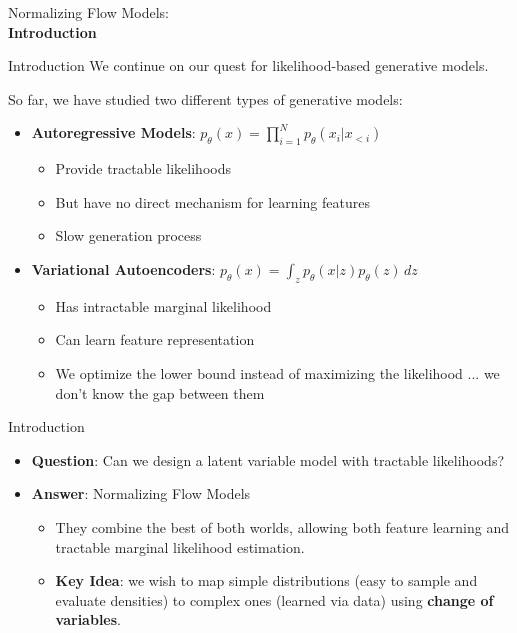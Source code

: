 \begin{frame}[allowframebreaks]{}
    \LARGE Normalizing Flow Models: \\[1.5ex] \textbf{Introduction}
\end{frame}

\begin{frame}[allowframebreaks]{Introduction}
We continue on our quest for likelihood-based generative models.

So far, we have studied two different types of generative models:
\begin{itemize}
    \item \textbf{Autoregressive Models}: $p_\theta(x) = \prod^N_{i=1} p_\theta(x_i|x_{<i})$
    \begin{itemize}
        \item Provide tractable likelihoods
        \item But have no direct mechanism for learning features
        \item Slow generation process
    \end{itemize}
    \item \textbf{Variational Autoencoders}: $p_\theta(x) = \int_z p_\theta(x|z) p_\theta(z) \, dz$
    \begin{itemize}
        \item Has intractable marginal likelihood
        \item Can learn feature representation
        \item We optimize the lower bound instead of maximizing the likelihood ... we don't know the gap between them
    \end{itemize}
\end{itemize}
\end{frame}

\begin{frame}{Introduction}
\begin{itemize}
    \item \textbf{Question}: Can we design a latent variable model with tractable likelihoods?

    \item<2->\textbf{Answer}: Normalizing Flow Models
        \begin{itemize} 
            \item They combine the best of both worlds, allowing both feature learning and tractable marginal likelihood estimation.
            \item \textbf{Key Idea}: we wish to map simple distributions (easy to sample and evaluate densities) to complex ones (learned via data) using \textbf{change of variables}.
        \end{itemize}
\end{itemize}
\end{frame}

